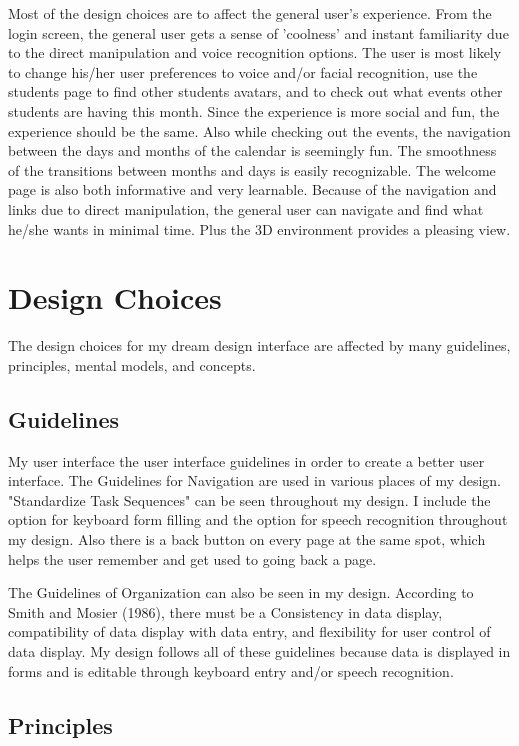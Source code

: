 \documentclass{article}
\begin{document}
Most of the design choices are to affect the general user's experience.  From the login screen, the general user gets a sense of 'coolness' and instant familiarity due to the direct manipulation and voice recognition options.  The user is most likely to change his/her user preferences to voice and/or facial recognition, use the students page to find other students avatars, and to check out what events other students are having this month.  Since the experience is more social and fun, the experience should be the same.  Also while checking out the events, the navigation between the days and months of the calendar is seemingly fun.  The smoothness of the transitions between months and days is easily recognizable.  The welcome page is also both informative and very learnable.  Because of the navigation and links due to direct manipulation, the general user can navigate and find what he/she wants in minimal time.  Plus the 3D environment provides a pleasing view.

\section{Design Choices}

The design choices for my dream design interface are affected by many guidelines, principles, mental models, and concepts.

\subsection{Guidelines}

My user interface the user interface guidelines in order to create a better user interface.  The Guidelines for Navigation are used in various places of my design.  "Standardize Task Sequences" can be seen throughout my design.  I include the option for keyboard form filling and the option for speech recognition throughout my design.  Also there is a back button on every page at the same spot, which helps the user remember and get used to going back a page. 

The Guidelines of Organization can also be seen in my design.   According to Smith and Mosier (1986), there must be a Consistency in data display, compatibility of data display with data entry, and flexibility for user control of data display.  My design follows all of these guidelines because data is displayed in forms and is editable through keyboard entry and/or speech recognition.

\subsection{Principles}







\end{document}
